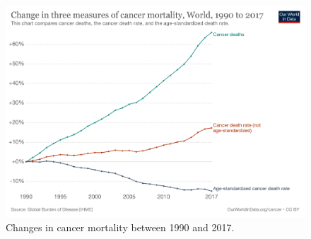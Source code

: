 \begin{figure}[!htb]
    \centering\includegraphics[width=1.0\textwidth,height=0.3\textheight,keepaspectratio]{Images/Resources/cancer-deaths-rate-and-age-standardized-rate-index.png}
      \caption{Changes in cancer mortality between 1990 and 2017. \cite{World_in_Data_undated-gc}}
      \label{fig:cancer_death}
  \end{figure}
  \FloatBarrier






